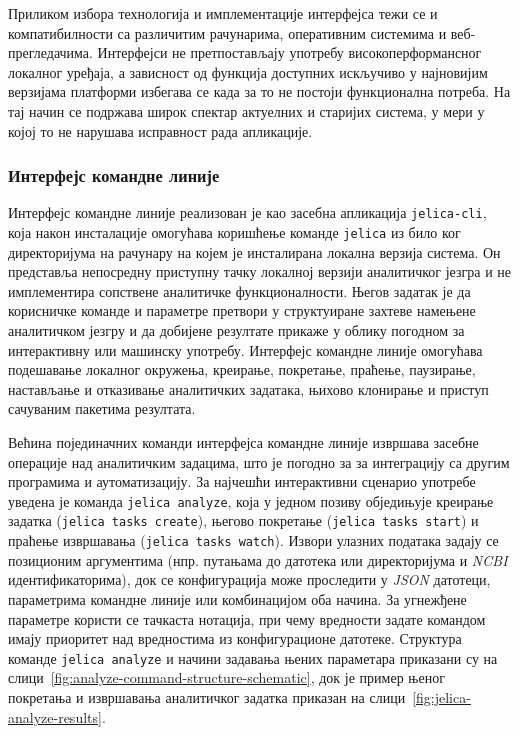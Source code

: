 \documentclass[12pt,oneside]{memoir}
\begin{document}
Приликом избора технологија и имплементације интерфејса тежи се и компатибилности са различитим рачунарима, оперативним системима и веб-прегледачима. Интерфејси не претпостављају употребу високоперформансног локалног уређаја, а зависност од функција доступних искључиво у најновијим верзијама платформи избегава се када за то не постоји функционална потреба. На тај начин се подржава широк спектар актуелних и старијих система, у мери у којој то не нарушава исправност рада апликације.


\subsubsection{Интерфејс командне линије}
Интерфејс командне линије реализован је као засебна апликација \texttt{jelica-cli}, која након инсталације омогућава коришћење команде \texttt{jelica} из било ког директоријума на рачунару на којем је инсталирана локална верзија система. Он представља непосредну приступну тачку локалној верзији аналитичког језгра и не имплементира сопствене аналитичке функционалности. Његов задатак је да корисничке команде и параметре претвори у структуиране захтеве намењене аналитичком језгру и да добијене резултате прикаже у облику погодном за интерактивну или машинску употребу. Интерфејс командне линије омогућава подешавање локалног окружења, креирање, покретање, праћење, паузирање, настављање и отказивање аналитичких задатака, њихово клонирање и приступ сачуваним пакетима резултата.

Већина појединачних команди интерфејса командне линије извршава засебне операције над аналитичким задацима, што је погодно за за интеграцију са другим програмима и аутоматизацију. За најчешћи интерактивни сценарио употребе уведена је команда \texttt{jelica analyze}, која у једном позиву обједињује креирање задатка (\texttt{jelica tasks create}), његово покретање (\texttt{jelica tasks start}) и праћење извршавања (\texttt{jelica tasks watch}). Извори улазних података задају се позиционим аргументима (нпр. путањама до датотека или директоријума и \textit{NCBI} идентификаторима), док се конфигурација може проследити у \textit{JSON} датотеци, параметрима командне линије или комбинацијом оба начина. За угнежђене параметре користи се тачкаста нотација, при чему вредности задате командом имају приоритет над вредностима из конфигурационе датотеке. Структура команде \texttt{jelica analyze} и начини задавања њених параметара приказани су на слици~\ref{fig:analyze-command-structure-schematic}, док је пример њеног покретања и извршавања аналитичког задатка приказан на слици~\ref{fig:jelica-analyze-results}.
\end{document}
